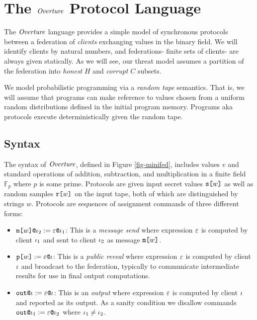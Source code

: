 \section{The $\mathit{Overture}$ Protocol Language}
\label{section-lang}

The $\mathit{Overture}$ language provides a simple model of synchronous
protocols between a federation of \emph{clients} exchanging values in
the binary field. We will identify clients by natural numbers, and
federations- finite sets of clients- are always given statically.
As we will see, our threat model assumes a partition of the federation
into \emph{honest} $H$ and \emph{corrupt} $C$ subsets.

We model probabilistic programming via a \emph{random tape}
semantics. That is, we will assume that programs can make reference to
values chosen from a uniform random distributions defined in the
initial program memory.  Programs aka protocols execute
deterministically given the random tape.

\subsection{Syntax}

\minifedfig

The syntax of $\mathit{Overture}$, defined in
Figure \ref{fig-minifed}, includes values $v$ and standard
operations of addition, subtraction, and multiplication in
a finite field $\mathbb{F}_p$ where $p$ is some prime. 
Protocols are given input secret values $\texttt{s[}w\texttt{]}$
as well as random samples $\texttt{r[}w\texttt{]}$ on the input
tape, both of which are distinguished by
strings $w$. Protocols are sequences of assignment
commands of three different forms:
\begin{itemize}
\item $\texttt{m[}w\texttt{]}\texttt{@}\iota_2 := \varepsilon\texttt{@}\iota_1$: This
  is a \emph{message send} where expression $\varepsilon$ is computed
  by client $\iota_1$ and sent to client $\iota_2$ as message
  $\texttt{m[}w\texttt{]}$.
\item $\texttt{p[}w\texttt{]} := \varepsilon\texttt{@}\iota$: This
  is a \emph{public reveal} where expression $\varepsilon$ is computed
  by client $\iota$ and broadcast to the federation, typically
  to communicate intermediate results for use in final output
  computations.
\item $\texttt{out}\texttt{@}\iota := \varepsilon\texttt{@}\iota$: This
  is an \emph{output} where expression $\varepsilon$ is computed
  by client $\iota$ and reported as its output. As a
  sanity condition we disallow commands
  $\texttt{out}\texttt{@}\iota_1 := \varepsilon\texttt{@}\iota_2$ where $\iota_1\ne\iota_2$.
\end{itemize}



